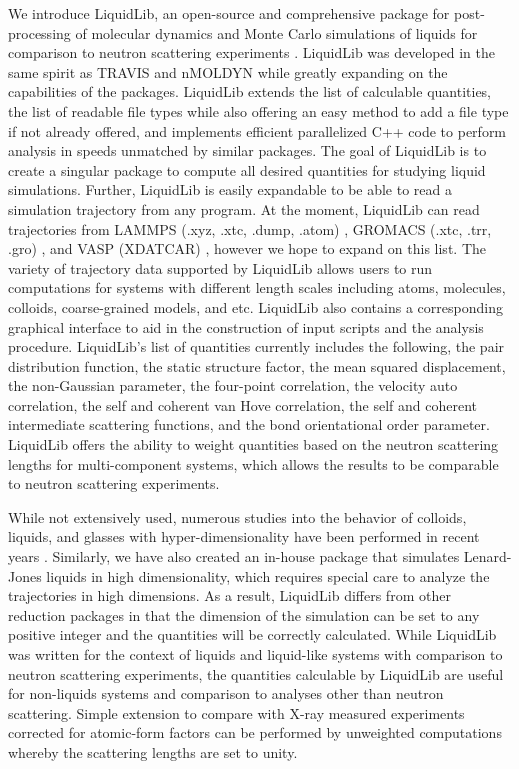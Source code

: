 We introduce LiquidLib, an open-source and comprehensive package for post-processing of molecular dynamics and Monte Carlo simulations of liquids for comparison to neutron scattering experiments \cite{LiquidLib}.  LiquidLib was developed in the same spirit as TRAVIS \cite{TRAVIS} and nMOLDYN \cite{nMOLDYN} while greatly expanding on the capabilities of the packages.  LiquidLib extends the list of calculable quantities, the list of readable file types while also offering an easy method to add a file type if not already offered, and implements efficient parallelized C++ code to perform analysis in speeds unmatched by similar packages.  The goal of LiquidLib is to create a singular package to compute all desired quantities for studying liquid simulations. Further, LiquidLib is easily expandable to be able to read a simulation trajectory from any program. At the moment, LiquidLib can read trajectories from LAMMPS (.xyz, .xtc, .dump, .atom) \cite{LAMMPS}, GROMACS (.xtc, .trr, .gro) \cite{GROMACS}, and VASP (XDATCAR) \cite{VASP}, however we hope to expand on this list. The variety of trajectory data supported by LiquidLib allows users to run computations for systems with different length scales including atoms, molecules, colloids, coarse-grained models, and etc.  LiquidLib also contains a corresponding graphical interface to aid in the construction of input scripts and the analysis procedure.  LiquidLib's list of quantities currently includes the following, the pair distribution function, the static structure factor, the mean squared displacement, the non-Gaussian parameter, the four-point correlation, the velocity auto correlation, the self and coherent van Hove correlation, the self and coherent intermediate scattering functions, and the bond orientational order parameter.  LiquidLib offers the ability to weight quantities based on the neutron scattering lengths for multi-component systems, which allows the results to be comparable to neutron scattering experiments. 

While not extensively used, numerous studies into the behavior of colloids, liquids, and glasses with hyper-dimensionality have been performed in recent years \cite{Charbonneau2012, Charbonneau2013}. Similarly, we have also created an in-house package that simulates Lenard-Jones liquids in high dimensionality, which requires special care to analyze the trajectories in high dimensions. As a result, LiquidLib differs from other reduction packages in that the dimension of the simulation can be set to any positive integer and the quantities will be correctly calculated.  While LiquidLib was written for the context of liquids and liquid-like systems with comparison to neutron scattering experiments, the quantities calculable by LiquidLib are useful for non-liquids systems and comparison to analyses other than neutron scattering. Simple extension to compare with X-ray measured experiments corrected for atomic-form factors can be performed by unweighted computations whereby the scattering lengths are set to unity.

